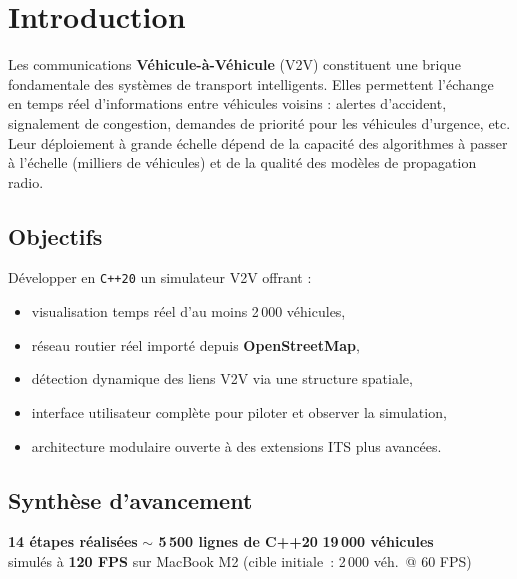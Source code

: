 \documentclass[a4paper,11pt]{article}
\begin{document}
\section{Introduction}

Les communications \textbf{V\'ehicule-\`a-V\'ehicule} (V2V) constituent une
brique fondamentale des syst\`emes de transport intelligents. Elles
permettent l'\'echange en temps r\'eel d'informations entre v\'ehicules
voisins : alertes d'accident, signalement de congestion, demandes de
priorit\'e pour les v\'ehicules d'urgence, etc. Leur d\'eploiement \`a grande
\'echelle d\'epend de la capacit\'e des algorithmes \`a passer \`a l'\'echelle
(milliers de v\'ehicules) et de la qualit\'e des mod\`eles de propagation
radio.

\subsection{Objectifs}

D\'evelopper en \texttt{C++20} un simulateur V2V offrant :

\begin{itemize}
\item visualisation temps r\'eel d'au moins 2\,000 v\'ehicules,
\item r\'eseau routier r\'eel import\'e depuis \textbf{OpenStreetMap},
\item d\'etection dynamique des liens V2V via une structure spatiale,
\item interface utilisateur compl\`ete pour piloter et observer la
      simulation,
\item architecture modulaire ouverte \`a des extensions ITS plus avanc\'ees.
\end{itemize}

\subsection{Synth\`ese d'avancement}

\begin{tcolorbox}[metric]
\centering\large
\textbf{14 \'etapes r\'ealis\'ees} \quad{\color{rule}\textbullet}\quad
\textbf{$\sim$ 5\,500 lignes de C++20} \quad{\color{rule}\textbullet}\quad
\textbf{19\,000 v\'ehicules} \\
simul\'es \`a \textbf{120 FPS} sur MacBook M2 (cible initiale~: 2\,000 v\'eh.\ @ 60 FPS)
\end{tcolorbox}
\end{document}
